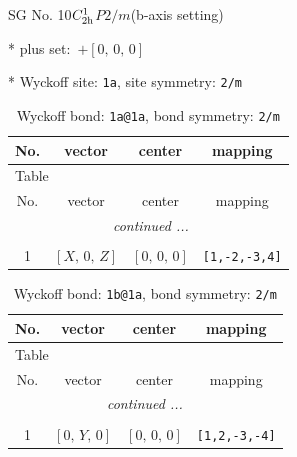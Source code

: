 \documentclass[fleqn,8pt]{jsarticle}
\begin{document}
\setcounter{MaxMatrixCols}{32}

\renewcommand{\tablename}{Table~}
\renewcommand{\figurename}{Figure~}
\begin{center}
\LARGE
SG No. 10\quad$C_{\rm 2h}^{1}$\quad$P2/m$\quad(b-axis setting)\quad[ monoclinic ]
\end{center}

* plus set:\,\,\,$+\left[ 0,\, 0,\, 0 \right]$


* Wyckoff site: {\tt 1a}, site symmetry: {\tt 2/m}
\renewcommand{\arraystretch}{1.2}
\begin{longtable}{cccc}
\caption{Wyckoff bond: {\tt 1a@1a}, bond symmetry: {\tt 2/m}}
 \\
 \hline \hline
No. & vector & center & mapping \\ \hline \endfirsthead

\multicolumn{3}{l}{\tablename\ \thetable{}} \\
 \hline \hline
No. & vector & center & mapping \\ \hline \endhead

 \hline \hline
\multicolumn{3}{r}{\footnotesize\it continued ...} \\ \endfoot

 \hline \hline
\multicolumn{3}{r}{} \\ \endlastfoot

1 & $\left[ X,\, 0,\, Z \right]$ & $\left[ 0,\, 0,\, 0 \right]$ & {\tt [1,-2,-3,4]} \\
\end{longtable}
\renewcommand{\arraystretch}{1.2}
\begin{longtable}{cccc}
\caption{Wyckoff bond: {\tt 1b@1a}, bond symmetry: {\tt 2/m}}
 \\
 \hline \hline
No. & vector & center & mapping \\ \hline \endfirsthead

\multicolumn{3}{l}{\tablename\ \thetable{}} \\
 \hline \hline
No. & vector & center & mapping \\ \hline \endhead

 \hline \hline
\multicolumn{3}{r}{\footnotesize\it continued ...} \\ \endfoot

 \hline \hline
\multicolumn{3}{r}{} \\ \endlastfoot

1 & $\left[ 0,\, Y,\, 0 \right]$ & $\left[ 0,\, 0,\, 0 \right]$ & {\tt [1,2,-3,-4]} \\
\end{longtable}
\end{document}
